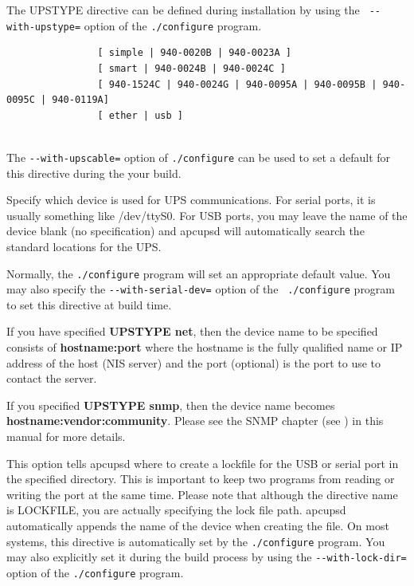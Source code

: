 {{{{{{{\begin{description}
The UPSTYPE directive can be defined during installation by using the {\tt
\verb{--{with-upstype=} option of the {\tt ./configure} program.  

\item [UPSCABLE \lt{}type of cable you are using\gt{}\gt{}]

\footnotesize
\begin{verbatim}
                [ simple | 940-0020B | 940-0023A ]
                [ smart | 940-0024B | 940-0024C ]
                [ 940-1524C | 940-0024G | 940-0095A | 940-0095B | 940-0095C | 940-0119A]
                [ ether | usb ]
     
\end{verbatim}
\normalsize

The {\tt \verb{--{with-upscable=} option of {\tt ./configure} can be used to set a
default for this directive during the your build.  

\item [DEVICE \lt{}name of device\gt{}]
   Specify which device is used for UPS communications. For serial ports, it is
usually something like /dev/ttyS0. For USB ports, you may leave the name of
the device blank (no specification) and apcupsd will automatically search the
standard locations for the UPS.  

Normally, the {\tt ./configure} program will set an appropriate default value.
You may also specify the {\tt \verb{--{with-serial-dev=} option of the {\tt
./configure} program to set this directive at build time.  

If you have specified {\bf UPSTYPE net}, then the device name to be specified
consists of {\bf hostname:port} where the hostname is the fully qualified name
or IP address of the host (NIS server) and the port (optional) is the port to
use to contact the server.  

If you specified {\bf UPSTYPE snmp}, then the device name becomes {\bf
hostname:vendor:community}. Please see the SNMP chapter (see 
) in this
manual for more details.  

\item [LOCKFILE \lt{}path to lockfile\gt{}]
   This option tells apcupsd where to create a lockfile for the USB or serial
port in the specified directory. This is important to keep two programs from
reading or writing the port at the same time. Please note that although the
directive name is LOCKFILE, you are actually specifying the lock file path.
apcupsd automatically appends the name of the device when creating the file.
On most systems, this directive is automatically set by the {\tt ./configure}
program.  You may also explicitly set it during the build process by using the
{\tt \verb{--{with-lock-dir=} option of the {\tt ./configure} program. 
\end{description}

}}}}}}}
